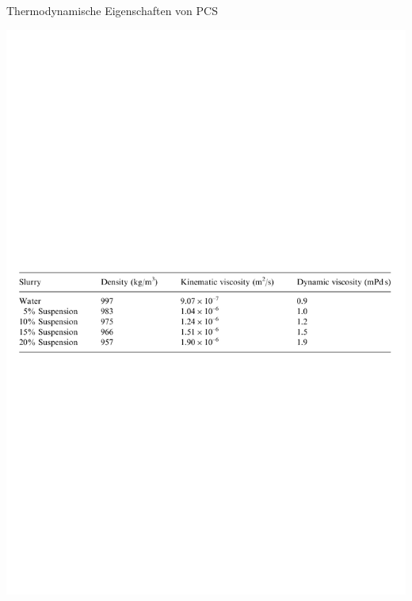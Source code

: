 \documentclass[11pt,a4paper]{scrartcl}
\begin{document}
\begin{table}[h!]
\begin{center}
\caption{Thermodynamische Eigenschaften von PCS \cite{Gschwander}}
\includegraphics[scale=0.6]{images/HenningTable.pdf}
\label{tab:PCSThermo}
\end{center}
\end{table}
\end{document}
